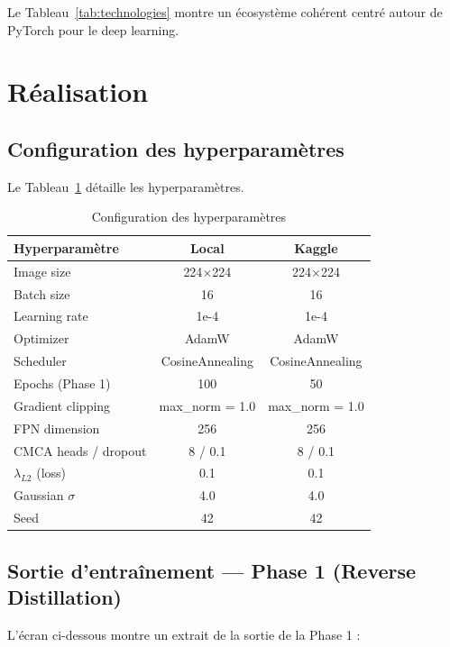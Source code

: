 \documentclass[12pt,a4paper,oneside]{report}
\begin{document}
Le Tableau~\ref{tab:technologies} montre un écosystème cohérent centré autour de PyTorch pour le deep learning.

\section{Réalisation}

\subsection{Configuration des hyperparamètres}

Le Tableau~\ref{tab:hyperparams} détaille les hyperparamètres.

\begin{table}[H]
\centering
\caption{Configuration des hyperparamètres}
\label{tab:hyperparams}
\begin{tabularx}{\textwidth}{X c c}
\toprule
\textbf{Hyperparamètre} & \textbf{Local} & \textbf{Kaggle} \\
\midrule
\rowcolor{tableheader} Image size & 224$\times$224 & 224$\times$224 \\
Batch size & 16 & 16 \\
\rowcolor{tableheader} Learning rate & 1e-4 & 1e-4 \\
Optimizer & AdamW & AdamW \\
\rowcolor{tableheader} Scheduler & CosineAnnealing & CosineAnnealing \\
Epochs (Phase 1) & 100 & 50 \\
\rowcolor{tableheader} Gradient clipping & max\_norm = 1.0 & max\_norm = 1.0 \\
FPN dimension & 256 & 256 \\
\rowcolor{tableheader} CMCA heads / dropout & 8 / 0.1 & 8 / 0.1 \\
$\lambda_{L2}$ (loss) & 0.1 & 0.1 \\
\rowcolor{tableheader} Gaussian $\sigma$ & 4.0 & 4.0 \\
Seed & 42 & 42 \\
\bottomrule
\end{tabularx}
\end{table}

\subsection{Sortie d'entraînement --- Phase 1 (Reverse Distillation)}

L'écran ci-dessous montre un extrait de la sortie de la Phase 1 :
\end{document}
